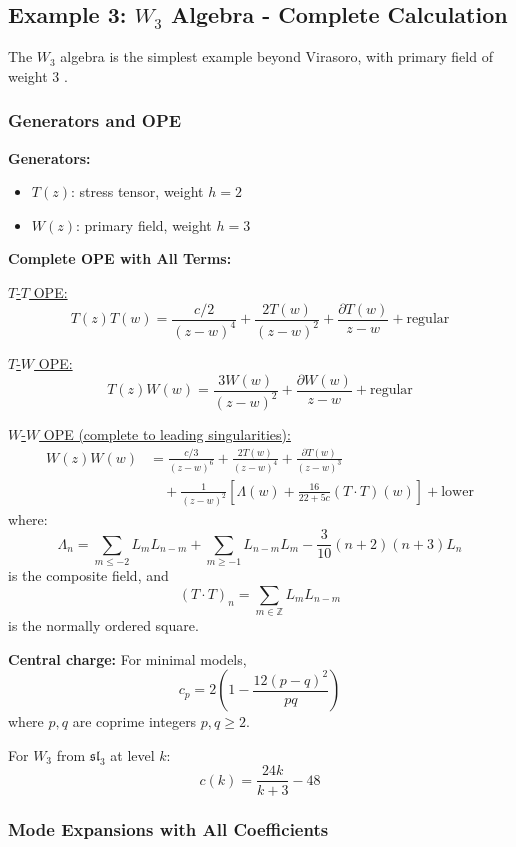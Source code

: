 \subsection{Example 3: $W_3$ Algebra - Complete Calculation}
\label{subsec:w3-complete}

The $W_3$ algebra is the simplest example beyond Virasoro, with primary field of weight 3 \cite{Zamolodchikov, Bouwknegt-Schoutens, Arakawa}.

\subsubsection{Generators and OPE}

\textbf{Generators:}
\begin{itemize}
\item $T(z)$: stress tensor, weight $h=2$
\item $W(z)$: primary field, weight $h=3$
\end{itemize}

\textbf{Complete OPE with All Terms:}

\underline{$T$-$T$ OPE:}
$$T(z)T(w) = \frac{c/2}{(z-w)^4} + \frac{2T(w)}{(z-w)^2} + \frac{\partial T(w)}{z-w} + \text{regular}$$

\underline{$T$-$W$ OPE:}
$$T(z)W(w) = \frac{3W(w)}{(z-w)^2} + \frac{\partial W(w)}{z-w} + \text{regular}$$

\underline{$W$-$W$ OPE (complete to leading singularities):}
\begin{align}
W(z)W(w) &= \frac{c/3}{(z-w)^6} + \frac{2T(w)}{(z-w)^4} + \frac{\partial T(w)}{(z-w)^3} \\
&\quad + \frac{1}{(z-w)^2}\left[\Lambda(w) + \frac{16}{22+5c}(T \cdot T)(w)\right] + \text{lower}
\end{align}
where:
$$\Lambda_n = \sum_{m \leq -2} L_m L_{n-m} + \sum_{m \geq -1} L_{n-m} L_m - \frac{3}{10}(n+2)(n+3)L_n$$
is the composite field, and
$$(T \cdot T)_n = \sum_{m \in \mathbb{Z}} L_m L_{n-m}$$
is the normally ordered square.

\textbf{Central charge:} For minimal models,
$$c_p = 2\left(1 - \frac{12(p-q)^2}{pq}\right)$$
where $p, q$ are coprime integers $p,q \geq 2$.

For $W_3$ from $\mathfrak{sl}_3$ at level $k$:
$$c(k) = \frac{24k}{k+3} - 48$$

\subsubsection{Mode Expansions with All Coefficients}

